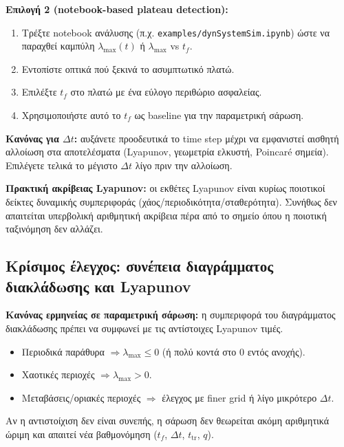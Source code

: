 \documentclass[11pt,a4paper]{report}
\begin{document}
\begin{guidebox}
\textbf{Επιλογή 2 (notebook-based plateau detection):}
\begin{enumerate}
\item Τρέξτε notebook ανάλυσης (π.χ. \texttt{examples/dynSystemSim.ipynb}) ώστε να παραχθεί καμπύλη $\lambda_{\max}(t)$ ή $\lambda_{\max}$ vs $t_f$.
\item Εντοπίστε οπτικά πού ξεκινά το ασυμπτωτικό πλατώ.
\item Επιλέξτε $t_f$ στο πλατώ με ένα εύλογο περιθώριο ασφαλείας.
\item Χρησιμοποιήστε αυτό το $t_f$ ως baseline για την παραμετρική σάρωση.
\end{enumerate}
\end{guidebox}

\begin{importantbox}
\textbf{Κανόνας για $\Delta t$:} αυξάνετε προοδευτικά το time step μέχρι να εμφανιστεί αισθητή αλλοίωση στα αποτελέσματα (Lyapunov, γεωμετρία ελκυστή, Poincar\'e σημεία). Επιλέγετε τελικά το μέγιστο $\Delta t$ λίγο πριν την αλλοίωση.

\textbf{Πρακτική ακρίβειας Lyapunov:} οι εκθέτες Lyapunov είναι κυρίως ποιοτικοί δείκτες δυναμικής συμπεριφοράς (χάος/περιοδικότητα/σταθερότητα). Συνήθως δεν απαιτείται υπερβολική αριθμητική ακρίβεια πέρα από το σημείο όπου η ποιοτική ταξινόμηση δεν αλλάζει.
\end{importantbox}

\subsection{Κρίσιμος έλεγχος: συνέπεια διαγράμματος διακλάδωσης και Lyapunov}

\begin{resultsbox}
\textbf{Κανόνας ερμηνείας σε παραμετρική σάρωση:} η συμπεριφορά του διαγράμματος διακλάδωσης πρέπει να συμφωνεί με τις αντίστοιχες Lyapunov τιμές.
\begin{itemize}
\item Περιοδικά παράθυρα $\Rightarrow \lambda_{\max} \le 0$ (ή πολύ κοντά στο 0 εντός ανοχής).
\item Χαοτικές περιοχές $\Rightarrow \lambda_{\max} > 0$.
\item Μεταβάσεις/οριακές περιοχές $\Rightarrow$ έλεγχος με finer grid ή λίγο μικρότερο $\Delta t$.
\end{itemize}
Αν η αντιστοίχιση δεν είναι συνεπής, η σάρωση δεν θεωρείται ακόμη αριθμητικά ώριμη και απαιτεί νέα βαθμονόμηση ($t_f$, $\Delta t$, $t_{\mathrm{tr}}$, $q$).
\end{resultsbox}
\end{document}
